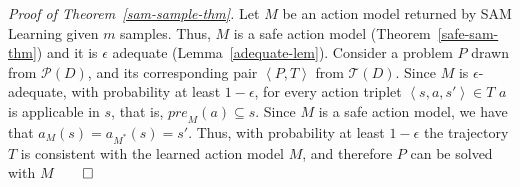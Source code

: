 \documentclass{article}
\newtheorem{corollary}{Corollary}
\newcommand{\tuple}[1]{\ensuremath{\left \langle #1 \right \rangle }}
\newcommand{\pre}{\textit{pre}}
\newcommand{\realm}{\ensuremath{M^*}\xspace}
\newcommand{\liftf}{F}
\newcommand{\lifta}{A}
\newcommand{\sam}{\textit{SAM}\xspace}
\begin{document}
\noindent
{\em Proof of Theorem~\ref{sam-sample-thm}.} 
Let $M$ be an action model returned by SAM Learning given $m$ samples. 
Thus, $M$ is a safe action model (Theorem~\ref{safe-sam-thm}) and it is $\epsilon$ adequate (Lemma~\ref{adequate-lem}). 
Consider a problem $P$ drawn from $\mathcal{P}(D)$, 
and its corresponding pair $\tuple{P, T}$ from $\mathcal{T}(D)$. 
Since $M$ is $\epsilon$-adequate, with probability at least $1-\epsilon$, 
for every action triplet $\tuple{s,a,s'}\in T$ 
$a$ is applicable in $s$, that is, $\pre_M(a)\subseteq s$. 
Since $M$ is a safe action model, we have that $a_M(s)=a_{\realm}(s)=s'$. 
Thus, with probability at least $1-\epsilon$ the trajectory $T$ is consistent with the learned action model $M$, and therefore $P$ can be solved with $M$\hfill$\qed$ 
\medskip

\end{document}
